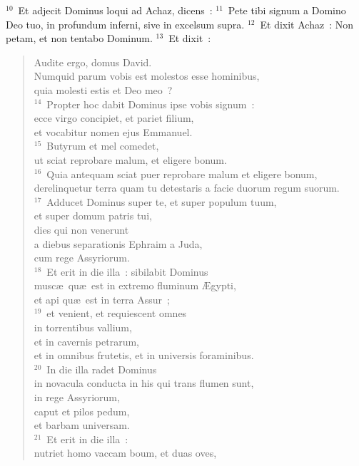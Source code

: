 ${}^{10}$~Et adjecit Dominus loqui ad Achaz, dicens~:
${}^{11}$~Pete tibi signum a Domino Deo tuo, in profundum inferni, sive in excelsum supra.
${}^{12}$~Et dixit Achaz~: Non petam, et non tentabo Dominum.
${}^{13}$~Et dixit~: \begin{verse}Audite ergo, domus David.\\ Numquid parum vobis est molestos esse hominibus,\\ quia molesti estis et Deo meo~?\\
${}^{14}$~Propter hoc dabit Dominus ipse vobis signum~:\\ ecce virgo concipiet, et pariet filium,\\ et vocabitur nomen ejus Emmanuel.\\
${}^{15}$~Butyrum et mel comedet,\\ ut sciat reprobare malum, et eligere bonum.\\
${}^{16}$~Quia antequam sciat puer reprobare malum et eligere bonum,\\ derelinquetur terra quam tu detestaris a facie duorum regum suorum.\\
${}^{17}$~Adducet Dominus super te, et super populum tuum,\\ et super domum patris tui,\\ dies qui non venerunt\\ a diebus separationis Ephraim a Juda,\\ cum rege Assyriorum.\\
${}^{18}$~Et erit in die illa~: sibilabit Dominus\\ musc\ae\ qu\ae\ est in extremo fluminum \AE gypti,\\ et api qu\ae\ est in terra Assur~;\\
${}^{19}$~et venient, et requiescent omnes\\ in torrentibus vallium,\\ et in cavernis petrarum,\\ et in omnibus frutetis, et in universis foraminibus.\\
${}^{20}$~In die illa radet Dominus\\ in novacula conducta in his qui trans flumen sunt,\\ in rege Assyriorum,\\ caput et pilos pedum,\\ et barbam universam.\\
${}^{21}$~Et erit in die illa~:\\ nutriet homo vaccam boum, et duas oves,\\

\end{verse}
